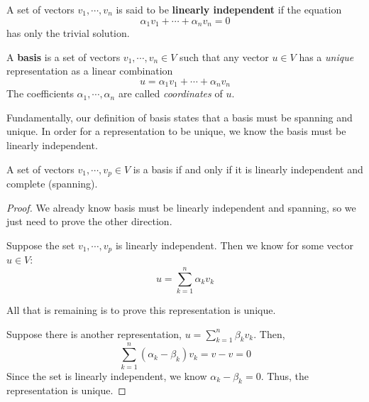 \begin{definition}
A set of vectors $v_{1}, \cdots, v_{n}$ is said to be \textbf{linearly independent} if the equation 
$$\alpha_{1} v_{1} + \cdots + \alpha_{n} v_{n} = 0$$
has only the trivial solution. 
\end{definition}

\begin{definition}
A \textbf{basis} is a set of vectors $v_{1}, \cdots , v_{n} \in V$ such that any vector $u \in V$ has a \textit{unique} representation as a linear combination 
$$u = \alpha_{1} v_{1} + \cdots + \alpha_{n} v_{n}$$
The coefficients $\alpha_{1}, \cdots, \alpha_{n}$ are called \textit{coordinates} of $u$.
\end{definition}

Fundamentally, our definition of basis states that a basis must be spanning and unique. In order for a representation to be unique, we know the basis must be linearly independent. 

\begin{theorem}
A set of vectors $v_{1}, \cdots, v_{p} \in V$ is a basis if and only if it is linearly independent and complete (spanning). 
\end{theorem}

\begin{proof}
We already know basis must be linearly independent and spanning, so we just need to prove the other direction. 

Suppose the set $v_{1}, \cdots, v_{p}$ is linearly independent. Then we know for some vector $u \in V$:
$$u = \sum_{k=1}^{n} \alpha_{k} v_{k}$$

All that is remaining is to prove this representation is unique. 

Suppose there is another representation, $u = \sum_{k=1}^{n} \beta_{k} v_{k}$. Then, 
$$\sum_{k=1}^{n} (\alpha_{k} - \beta_{k}) v_{k} = v - v = 0$$
Since the set is linearly independent, we know $\alpha_{k} - \beta_{k} = 0$. Thus, the representation is unique. 
\end{proof}

